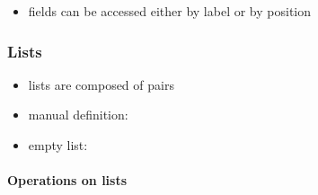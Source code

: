 \documentclass[a4paper,landscape,10pt]{article}
\begin{document}
\begin{multicols*}{2}
  \begin{itemize}
    \item fields can be accessed either by label or by position
  \end{itemize}

  \subsubsection{Lists}

  \begin{itemize}
    \item lists are composed of pairs
    \item manual definition: \ihaskell{[1, 2, 3]}
    \item empty list: \ihaskell{[]}
  \end{itemize}

  \paragraph{Operations on lists}


\end{multicols*}
\end{document}

